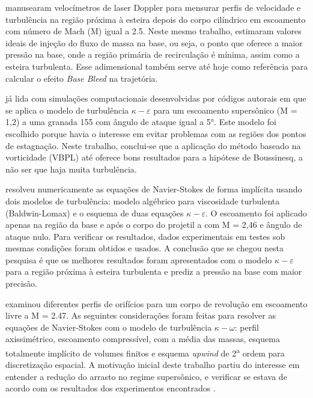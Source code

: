 \citeauthor{Mathur&Dutton1996} manusearam velocímetros de laser Doppler para mensurar perfis de velocidade e turbulência na região próxima à esteira depois do corpo cilíndrico em escoamento com número de Mach (M) igual a \num{2,5}. Neste mesmo trabalho, estimaram valores ideais de injeção do fluxo de massa na base, ou seja, o ponto que oferece a maior pressão na base, onde a região primária de recirculação é mínima, assim como a esteira turbulenta. Esse adimensional também serve até hoje como referência para calcular o efeito \textit{Base Bleed} na trajetória. 

\citeauthor{Kauri1997} já lida com simulações computacionais desenvolvidas por códigos autorais em que se aplica o modelo de turbulência \(\kappa-\varepsilon\) para um escoamento supersônico (M = 1,2) a uma granada \qty{155}{\millimetre} com ângulo de ataque igual a \ang{5}. Este modelo foi escolhido porque havia o interesse em evitar problemas com as regiões dos pontos de estagnação. Neste trabalho, conclui-se que a aplicação do método baseado na vorticidade (VBPL) até oferece bons resultados para a hipótese de Boussinesq, a não ser que haja muita turbulência. 

\citeauthor{Sahu1997} resolveu numericamente as equações de Navier-Stokes de forma implícita usando dois modelos de turbulência: modelo algébrico para viscosidade turbulenta (Baldwin-Lomax) e o esquema de duas equações \(\kappa-\varepsilon\). O escoamento foi aplicado apenas na região da base e após o corpo do projetil a com M = 2,46 e ângulo de ataque nulo. Para verificar os resultados, dados experimentais em testes sob mesmas condições foram obtidos e usados. A conclusão que se chegou nesta pesquisa é que os melhores resultados foram apresentados com o modelo \(\kappa-\varepsilon\) para a região próxima à esteira turbulenta e prediz a pressão na base com maior precisão.

\citeauthor{Lee2006Sep} examinou diferentes perfis de orifícios para um corpo de revolução em escoamento livre a M = \num{2,47}. As seguintes considerações foram feitas para resolver as equações de Navier-Stokes com o modelo de turbulência \(\kappa-\omega\): perfil axissimétrico, escoamento compressível, com a média das massas, esquema totalmente implícito de volumes finitos e esquema \textit{upwind} de 2\textsuperscript{a} ordem para discretização espacial. A motivação inicial deste trabalho partiu do interesse em entender a redução do arrasto no regime supersônico, e verificar se estava de acordo com os resultados dos experimentos encontrados \cite{Bourdon2003Feb}.

